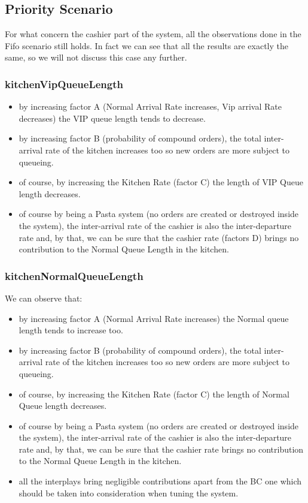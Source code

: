\subsection{Priority Scenario}

For what concern the cashier part of the system, all the observations done in the Fifo scenario still holds. In fact we can see that all the results are exactly the same, so we will not discuss this case any further.

\subsubsection{kitchenVipQueueLength}


\begin{itemize}
    \item by increasing factor A (Normal Arrival Rate increases, Vip arrival Rate decreases) the VIP queue length tends to decrease.
    \item by increasing factor B (probability of compound orders), the total inter-arrival rate of the kitchen increases too so new orders are more subject to queueing.
    \item of course, by increasing the Kitchen Rate (factor C) the length of VIP Queue length decreases.
    \item of course by being a Pasta system (no orders are created or destroyed inside the system), the inter-arrival rate of the cashier is also the inter-departure rate and, by that, we can be sure that the cashier rate (factors D) brings no contribution to the Normal Queue Length in the kitchen. %
\end{itemize}

\subsubsection{kitchenNormalQueueLength}


We can observe that:
\begin{itemize}
    \item by increasing factor A (Normal Arrival Rate increases) the Normal queue length tends to increase too.
    \item by increasing factor B (probability of compound orders), the total inter-arrival rate of the kitchen increases too so new orders are more subject to queueing.
    \item of course, by increasing the Kitchen Rate (factor C) the length of Normal Queue length decreases.
    \item of course by being a Pasta system (no orders are created or destroyed inside the system), the inter-arrival rate of the cashier is also the inter-departure rate and, by that, we can be sure that the cashier rate brings no contribution to the Normal Queue Length in the kitchen. %
    \item all the interplays bring negligible contributions apart from the BC one which should be taken into consideration when tuning the system. %
\end{itemize}

